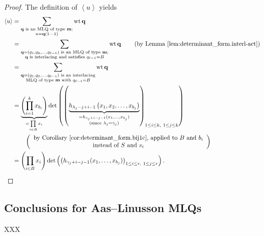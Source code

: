 \documentclass[reqno]{amsart}%
\newcommand{\0}{\phantom{c}}
\let\sumnonlimits\sum
\let\prodnonlimits\prod
\renewcommand{\sum}{\sumnonlimits\limits}
\renewcommand{\prod}{\prodnonlimits\limits}
\theoremstyle{plain}
\theoremstyle{definition}
\numberwithin{equation}{section}
\begin{document}
\begin{proof}
The definition of $\left\langle u\right\rangle $ yields%
\begin{align*}
\left\langle u\right\rangle  &  =\sum_{\substack{\mathbf{q}\text{ is an MLQ of
type }\mathbf{m};\\u=\mathbf{q}\left(  1\cdots1\right)  }}\operatorname*{wt}%
\mathbf{q}\\
&  =\sum_{\substack{\mathbf{q}=\left(  q_{1},q_{2},\ldots,q_{\ell-1}\right)
\text{ is an MLQ of type }\mathbf{m};\\\mathbf{q}\text{ is interlacing and
satisfies }q_{\ell-1}=B}}\operatorname*{wt}\mathbf{q}\qquad\left(  \text{by
Lemma \ref{lem:determinant_form.interl-act}}\right) \\
&  =\sum_{\substack{\mathbf{q}=\left(  q_{1},q_{2},\ldots,q_{\ell-1}\right)
\text{ is an interlacing}\\\text{MLQ of type }\mathbf{m}\text{ with }%
q_{\ell-1}=B}}\operatorname*{wt}\mathbf{q}\\
&  =\underbrace{\left(  \prod_{i=1}^{k}x_{b_{i}}\right)  }_{=\prod_{i\in
B}x_{i}}\det\left(  \left(  \underbrace{h_{\lambda_{j}-j+i-1}\left(
x_{1},x_{2},\ldots,x_{b_{j}}\right)  }_{\substack{=h_{\gamma_{j}+i-j-1}%
(x_{1},\dotsc,x_{b_{j}})\\\text{(since }\lambda_{j}=\gamma_{j}\text{)}%
}}\right)  _{1\leq i\leq k,\ 1\leq j\leq k}\right) \\
&  \qquad\left(
\begin{array}
[c]{c}%
\text{by Corollary \ref{cor:determinant_form.bij1c}, applied to }B\text{ and
}b_{i}\\
\text{instead of }S\text{ and }s_{i}%
\end{array}
\right) \\
&  =\left(  \prod_{i\in B}x_{i}\right)  \det\left(  \left(  h_{\gamma
_{j}+i-j-1}(x_{1},\dotsc,x_{b_{j}})\right)  _{1\leq i\leq r,\ 1\leq j\leq
r}\right)  .
\end{align*}

\end{proof}

\subsection{Conclusions for Aas--Linusson MLQs}

XXX



{}
\end{document}
